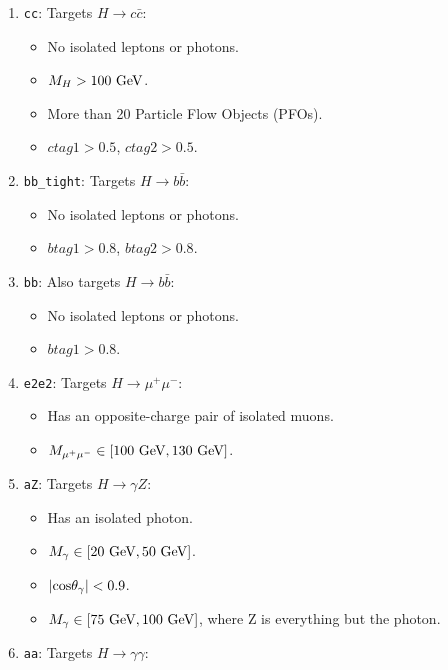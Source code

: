 \documentclass[11pt, hidelinks, a4paper]{scrartcl}
\newcommand{\tn}[1]{\textnormal{#1}}
\newcommand{\eV}{\text{e\kern-0.15ex V}\xspace}
\newcommand{\GeV}{\text{G\eV}\xspace}
\begin{document}
  {\small\begin{multicols}{2}
  \begin{enumerate}
      \item \texttt{cc}: Targets $H \to c \bar{c}$:
      \begin{itemize}
          \item No isolated leptons or photons.
          \item $M_H > 100~\GeV$.
          \item More than 20 Particle Flow Objects (PFOs).
          \item $ctag1 > 0.5$, $ctag2 > 0.5$.
      \end{itemize}
      \item \texttt{bb\_tight}: Targets $H \to b \bar{b}$:
      \begin{itemize}
          \item No isolated leptons or photons.
          \item $btag1 > 0.8$, $btag2 > 0.8$.
      \end{itemize}
      \item \texttt{bb}: Also targets $H \to b \bar{b}$:
      \begin{itemize}
          \item No isolated leptons or photons.
          \item $btag1 > 0.8$.
      \end{itemize}
      \item \texttt{e2e2}: Targets $H \to \mu^+ \mu^-$:
      \begin{itemize}
          \item Has an opposite-charge pair of isolated muons.
          \item $M_{\mu^+ \mu^-} \in \left[100~\GeV, 130~\GeV \right]$.
      \end{itemize}
      \item \texttt{aZ}: Targets $H \to \gamma Z$:
      \begin{itemize}
          \item Has an isolated photon.
          \item $M_{\gamma} \in \left[20~\GeV, 50~\GeV \right]$.
          \item $\left| \tn{cos}\theta_{\gamma} \right| < 0.9$.
          \item $M_{\gamma} \in \left[75~\GeV, 100~\GeV \right]$,
              where Z is everything but the photon.
      \end{itemize}
      \item \texttt{aa}: Targets $H \to \gamma \gamma$:

\end{enumerate}
\end{multicols}}
\end{document}
